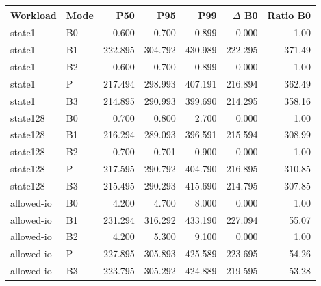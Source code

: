 \begin{tabular}{llrrrrr}
\toprule
Workload & Mode & P50 & P95 & P99 & $\Delta$ B0 & Ratio B0 \\
\midrule
state1 & B0 & 0.600 & 0.700 & 0.899 & 0.000 & 1.00 \\
state1 & B1 & 222.895 & 304.792 & 430.989 & 222.295 & 371.49 \\
state1 & B2 & 0.600 & 0.700 & 0.899 & 0.000 & 1.00 \\
state1 & P & 217.494 & 298.993 & 407.191 & 216.894 & 362.49 \\
state1 & B3 & 214.895 & 290.993 & 399.690 & 214.295 & 358.16 \\
state128 & B0 & 0.700 & 0.800 & 2.700 & 0.000 & 1.00 \\
state128 & B1 & 216.294 & 289.093 & 396.591 & 215.594 & 308.99 \\
state128 & B2 & 0.700 & 0.701 & 0.900 & 0.000 & 1.00 \\
state128 & P & 217.595 & 290.792 & 404.790 & 216.895 & 310.85 \\
state128 & B3 & 215.495 & 290.293 & 415.690 & 214.795 & 307.85 \\
allowed-io & B0 & 4.200 & 4.700 & 8.000 & 0.000 & 1.00 \\
allowed-io & B1 & 231.294 & 316.292 & 433.190 & 227.094 & 55.07 \\
allowed-io & B2 & 4.200 & 5.300 & 9.100 & 0.000 & 1.00 \\
allowed-io & P & 227.895 & 305.893 & 425.589 & 223.695 & 54.26 \\
allowed-io & B3 & 223.795 & 305.292 & 424.889 & 219.595 & 53.28 \\
\bottomrule
\end{tabular}
